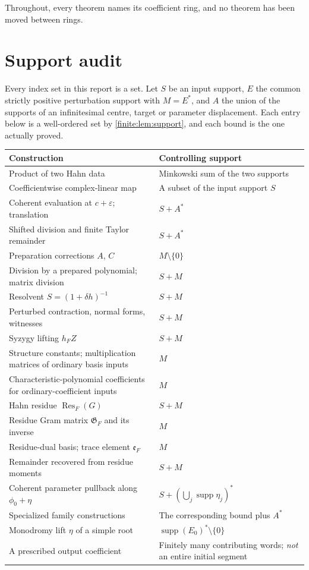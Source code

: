 \documentclass[11pt,letterpaper]{article}
\theoremstyle{definition}
\theoremstyle{remark}
\newcommand{\Gram}{\mathfrak G}
\newcommand{\Eul}{\mathfrak e}
\DeclareMathOperator{\supp}{supp}
\DeclareMathOperator{\Res}{Res}
\numberwithin{equation}{section}
\begin{document}
Throughout, every theorem names its coefficient ring, and no theorem has been moved between rings.

\appendix
\section{Support audit}
\label{finite:app:support}

Every index set in this report is a set. Let $S$ be an input support, $E$ the common strictly positive perturbation support with $M=E^*$, and $A$ the union of the supports of an infinitesimal centre, target or parameter displacement. Each entry below is a well-ordered set by \cref{finite:lem:support}, and each bound is the one actually proved.

\begin{center}\small
\begin{longtable}{@{}L{0.47\textwidth}L{0.45\textwidth}@{}}
\toprule
Construction & Controlling support\\
\midrule
\endhead
Product of two Hahn data & Minkowski sum of the two supports\\[0.3em]
Coefficientwise complex-linear map & A subset of the input support $S$\\[0.3em]
Coherent evaluation at $c+\varepsilon$; translation & $S+A^*$\\[0.3em]
Shifted division and finite Taylor remainder & $S+A^*$\\[0.3em]
Preparation corrections $A$, $C$ & $M\setminus\{0\}$\\[0.3em]
Division by a prepared polynomial; matrix division & $S+M$\\[0.3em]
Resolvent $S=(1+\delta h)^{-1}$ & $S+M$\\[0.3em]
Perturbed contraction, normal forms, witnesses & $S+M$\\[0.3em]
Syzygy lifting $h_FZ$ & $S+M$\\[0.3em]
Structure constants; multiplication matrices of ordinary basis inputs & $M$\\[0.3em]
Characteristic-polynomial coefficients for ordinary-coefficient inputs & $M$\\[0.3em]
Hahn residue $\Res_F(G)$ & $S+M$\\[0.3em]
Residue Gram matrix $\Gram_F$ and its inverse & $M$\\[0.3em]
Residue-dual basis; trace element $\Eul_F$ & $M$\\[0.3em]
Remainder recovered from residue moments & $S+M$\\[0.3em]
Coherent parameter pullback along $\phi_0+\eta$ & $S+(\bigcup_j\supp\eta_j)^*$\\[0.3em]
Specialized family constructions & The corresponding bound plus $A^*$\\[0.3em]
Monodromy lift $\eta$ of a simple root & $\supp(E_0)^*\setminus\{0\}$\\[0.3em]
A prescribed output coefficient & Finitely many contributing words; \emph{not} an entire initial segment\\
\bottomrule
\end{longtable}
\end{center}
\end{document}
